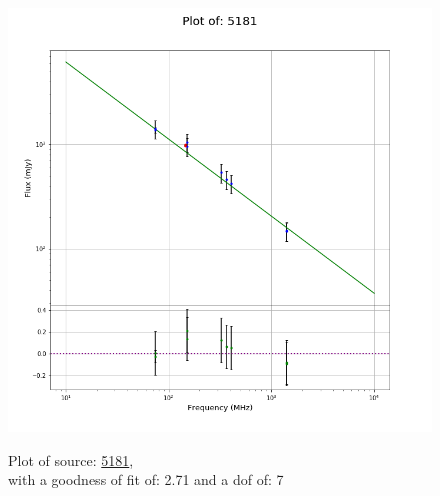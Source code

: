 \documentclass{article}
\begin{document}
\begin{figure}[H]
\begin{minipage}{0.5\textwidth}
        \includegraphics[scale = 0.35]{KmeulenSimSource_1hr/1hr5181.png}
        \captionsetup{labelformat=empty}
        \caption{Plot of source: \href{http://banana.transientskp.org/r4/vlo_KmeulenSimSource/runningcatalog/5181}{5181},\\with a goodness of fit of: 2.71 and a dof of: 7}
    \addtocounter{figure}{-1}
    \label{KmeulenSimSource:1hr:5181:plot}
    \end{minipage}
\end{figure}
\end{document}
